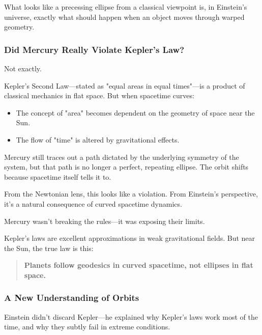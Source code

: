What looks like a precessing ellipse from a classical viewpoint is, in Einstein’s universe, exactly what should happen when an object moves through warped geometry.

\subsubsection*{Did Mercury Really Violate Kepler’s Law?}

Not exactly.

Kepler’s Second Law—stated as "equal areas in equal times"—is a product of classical mechanics in flat space. But when spacetime curves:

\begin{itemize}
  \item The concept of "area" becomes dependent on the geometry of space near the Sun.
  \item The flow of "time" is altered by gravitational effects.
\end{itemize}

Mercury still traces out a path dictated by the underlying symmetry of the system, but that path is no longer a perfect, repeating ellipse. The orbit shifts because spacetime itself tells it to.

From the Newtonian lens, this looks like a violation.  
From Einstein’s perspective, it’s a natural consequence of curved spacetime dynamics.

\begin{tcolorbox}[colback=blue!5!white, colframe=blue!50!black, title={Mercury’s Precession: Gravity Revealed}]
Mercury wasn’t breaking the rules—it was exposing their limits.

Kepler’s laws are excellent approximations in weak gravitational fields.  
But near the Sun, the true law is this:

\begin{quote}
\textbf{Planets follow geodesics in curved spacetime, not ellipses in flat space.}
\end{quote}
\end{tcolorbox}

\subsubsection*{A New Understanding of Orbits}

Einstein didn’t discard Kepler—he explained why Kepler’s laws work most of the time, and why they subtly fail in extreme conditions.

